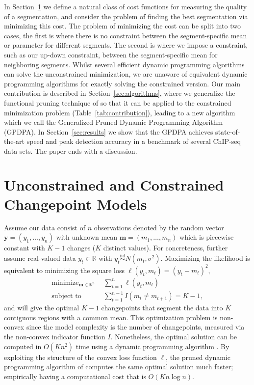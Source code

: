 \documentclass[aoas]{imsart}
\DeclareMathOperator*{\minimize}{minimize}
\newcommand{\RR}{\mathbb R}
\begin{document}
In Section~\ref{sec:models} we define a natural class of cost functions for 
measuring the quality of a segmentation, and consider the problem of finding the best segmentation
via minimizing this cost. The problem of minimizing the cost can be split into two cases, the first
is where there is no constraint between the segment-specific mean or parameter for different segments. The
second is where we impose a constraint, such as our up-down constraint, between the segment-specific
mean for neighboring segments. Whilst several efficient dynamic programming algorithms
can solve the unconstrained minimization, we are unaware of equivalent dynamic programming
algorithms for exactly solving the constrained version.  Our main contribution is described in 
Section~\ref{sec:algorithms}, where we generalize the functional pruning
technique of \citet{pruned-dp} so that it can be applied to the constrained minimization problem (Table~\ref{tab:contribution}), leading to a new algorithm which we call the Generalized
Pruned Dynamic Programming Algorithm (GPDPA). In Section~\ref{sec:results} 
we show that the GPDPA achieves state-of-the-art speed and peak detection accuracy in a benchmark of several ChIP-seq data sets. The paper ends with a discussion.

\section{Unconstrained and Constrained Changepoint Models}
\label{sec:models}

Assume our data consist of $n$ observations denoted by the random
vector $\mathbf y = (y_1, \dots, y_n)$ with unknown mean
$\mathbf m = (m_1,\dots, m_n)$ which is piecewise constant with $K-1$
changes ($K$ distinct values). For concreteness, further assume
real-valued data $y_t\in\RR$ with
$y_t\stackrel{\text{iid}}{\sim}N(m_t,\sigma^2)$. Maximizing the
likelihood is equivalent to minimizing the square loss
$\ell(y_t,m_t)=(y_t-m_t)^2$,
\begin{align}
  \label{eq:optimal_segment_neighborhood}
  \minimize_{\mathbf m\in\RR^n} &\ \ 
  \sum_{t=1}^n \ell(y_t, m_t)\\
  \text{subject to} &\ \  \sum_{t=1}^{n-1} I(m_t \neq m_{t+1}) = K-1,
  \nonumber
\end{align}
and will give the optimal $K-1$ changepoints that segment the data into $K$
contiguous regions with a common mean.  This optimization problem is non-convex since the model complexity is
the number of changepoints, measured via the non-convex indicator
function $I$. Nonetheless, the optimal solution can be computed in
$O(K n^2)$ time using a dynamic programming algorithm
\citep{segment-neighborhood}. By exploiting the structure of the
convex loss function $\ell$, the pruned dynamic programming algorithm
of \citet{pruned-dp} computes the same optimal solution much faster; empirically
having a computational cost that is
$O(K n \log n)$.
\end{document}
